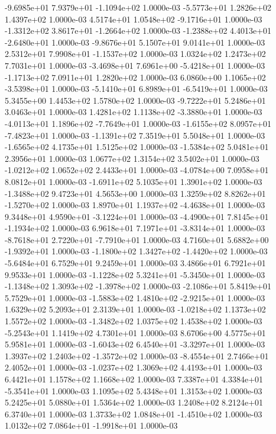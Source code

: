 -9.6985e+01  7.9379e+01 -1.1094e+02  1.0000e-03
-5.5773e+01  1.2826e+02  1.4397e+02  1.0000e-03
 4.5174e+01  1.0548e+02 -9.1716e+01  1.0000e-03
-1.3312e+02  3.8617e+01 -1.2664e+02  1.0000e-03
-1.2388e+02  4.4013e+01 -2.6480e+01  1.0000e-03
-9.8676e+01  5.1507e+01  9.0141e+01  1.0000e-03
 2.5312e+01  7.9908e+01 -1.1537e+02  1.0000e-03
1.0324e+02 1.2473e+02 7.7031e+01  1.0000e-03
-3.4698e+01  7.6961e+00 -5.4218e+01  1.0000e-03
-1.1713e+02  7.0911e+01  1.2820e+02  1.0000e-03
 6.0860e+00  1.1065e+02 -3.5398e+01  1.0000e-03
-5.1410e+01  6.8989e+01 -6.5419e+01  1.0000e-03
5.3455e+00 1.4453e+02 1.5780e+02  1.0000e-03
-9.7222e+01  5.2486e+01  3.0463e+01  1.0000e-03
 1.4281e+02  1.1138e+02 -3.3880e+01  1.0000e-03
-4.0113e+01  1.1896e+02 -7.7649e+01  1.0000e-03
-1.6155e+02  8.0957e+01 -7.4823e+01  1.0000e-03
-1.1391e+02  7.3519e+01  5.5048e+01  1.0000e-03
-1.6565e+02  4.1735e+01  1.5125e+02  1.0000e-03
-1.5384e+02  5.0481e+01  2.3956e+01  1.0000e-03
1.0677e+02 1.3154e+02 3.5402e+01  1.0000e-03
-1.0212e+02  1.0652e+02  2.4433e+01  1.0000e-03
-4.0784e+00  7.0958e+01  8.0812e+01  1.0000e-03
-1.6911e+02  5.1035e+01  1.3901e+02  1.0000e-03
-1.3488e+02  9.4723e+01  4.5653e+00  1.0000e-03
 1.3259e+02  8.8262e+01 -1.5270e+02  1.0000e-03
 1.8970e+01  1.1937e+02 -4.4638e+01  1.0000e-03
 9.3448e+01  4.9590e+01 -3.1224e+01  1.0000e-03
-4.4900e+01  7.8145e+01 -1.1934e+02  1.0000e-03
 6.9618e+01  7.1971e+01 -3.8314e+01  1.0000e-03
-8.7618e+01  2.7220e+01 -7.7910e+01  1.0000e-03
 4.7160e+01  5.6882e+00 -1.9392e+01  1.0000e-03
-1.1800e+02  1.3427e+02 -1.4420e+02  1.0000e-03
-5.6484e+01  6.7529e+01  9.2459e+01  1.0000e-03
3.4866e+01 6.7921e+01 9.9533e+01  1.0000e-03
-1.1228e+02  5.3241e+01 -5.3450e+01  1.0000e-03
-1.1348e+02  1.3093e+02 -1.3978e+02  1.0000e-03
-2.1086e+01  5.8419e+01  5.7529e+01  1.0000e-03
-1.5883e+02  1.4810e+02 -2.9215e+01  1.0000e-03
1.6329e+02 5.2093e+01 2.3139e+01  1.0000e-03
-1.0218e+02  1.1373e+02  1.5572e+02  1.0000e-03
-1.3482e+02  1.0375e+02  1.4538e+02  1.0000e-03
-5.2543e+01  1.1419e+02  4.7301e+01  1.0000e-03
8.6706e+00 4.5775e+01 5.9581e+01  1.0000e-03
-1.6043e+02  6.4540e+01 -3.3297e+01  1.0000e-03
 1.3937e+02  1.2403e+02 -1.3572e+02  1.0000e-03
-8.4554e+01  2.7466e+01  2.4052e+01  1.0000e-03
-1.0237e+02  1.3069e+02  4.4193e+01  1.0000e-03
6.4421e+01 1.1578e+02 1.1668e+02  1.0000e-03
 7.3387e+01  4.3384e+01 -5.3541e+01  1.0000e-03
1.1095e+02 5.4348e+01 1.3153e+02  1.0000e-03
5.2425e+01 5.0880e+01 1.5364e+02  1.0000e-03
1.2408e+02 8.2124e+01 6.3740e+01  1.0000e-03
 1.3733e+02  1.0848e+01 -1.4510e+02  1.0000e-03
 1.0132e+02  7.0864e+01 -1.9918e+01  1.0000e-03
